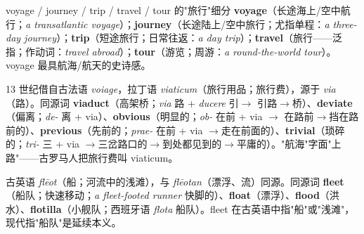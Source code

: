 \documentclass[../main.tex]{subfiles}
\begin{document}



\begin{lex}{voyage / journey / trip / travel / tour 的"旅行"细分}
\textbf{voyage}（长途海上/空中航行；\textit{a transatlantic voyage}）；\textbf{journey}（长途陆上/空中旅行；尤指单程：\textit{a three-day journey}）；\textbf{trip}（短途旅行；日常往返：\textit{a day trip}）；\textbf{travel}（旅行——泛指；作动词：\textit{travel abroad}）；\textbf{tour}（游览；周游：\textit{a round-the-world tour}）。voyage 最具航海/航天的史诗感。
\end{lex}

\begin{origin}
13 世纪借自古法语 \textit{voiage}，拉丁语 \textit{viaticum}（旅行用品；旅行费），源于 \textit{via}（路）。同源词 \textbf{viaduct}（高架桥；\textit{via} 路 + \textit{ducere} 引$\to$ 引路$\to$桥）、\textbf{deviate}（偏离；\textit{de-} 离 + via）、\textbf{obvious}（明显的；\textit{ob-} 在前 + via $\to$ 在路前$\to$挡在路前的）、\textbf{previous}（先前的；\textit{prae-} 在前 + via $\to$走在前面的）、\textbf{trivial}（琐碎的；\textit{tri-} 三 + via $\to$三岔路口的$\to$到处都见到的$\to$平庸的）。"航海"字面"上路"——古罗马人把旅行费叫 viaticum。
\end{origin}




\begin{origin}
古英语 \textit{flēot}（船；河流中的浅滩），与 \textit{flēotan}（漂浮、流）同源。同源词 \textbf{fleet}（船队；快速移动；\textit{a fleet-footed runner} 快脚的）、\textbf{float}（漂浮）、\textbf{flood}（洪水）、\textbf{flotilla}（小舰队；西班牙语 \textit{flota} 船队）。fleet 在古英语中指"船"或"浅滩"，现代指"船队"是延续本义。
\end{origin}
\end{document}
